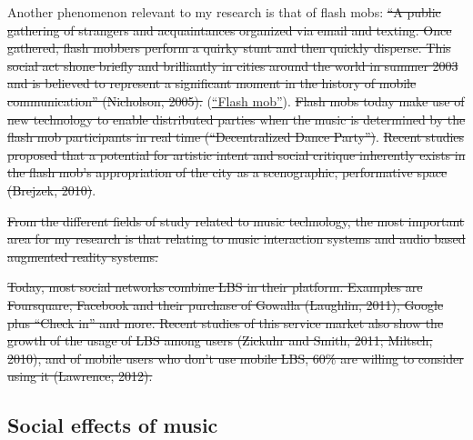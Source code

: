 Another phenomenon relevant to my research is that of flash mobs: \st{``A public gathering of strangers and acquaintances organized via email and texting. Once gathered, flash mobbers perform a quirky stunt and then quickly disperse. This social act shone briefly and brilliantly in cities around the world in summer 2003 and is believed to represent a significant moment in the history of mobile communication'' (Nicholson, 2005).}  (\href{http://en.wikipedia.org/wiki/Flash_mob}{``Flash mob''}).  \st{Flash mobs today make use of new technology to enable distributed parties when the music is determined by the flash mob participants in real time (``Decentralized Dance Party'')}. \st{Recent studies proposed that a potential for artistic intent and social critique inherently exists in the flash mob's appropriation of the city as a scenographic, performative space (Brejzek, 2010)}. 

\st{From the different fields of study related to music technology, the most important area for my research is that relating to music interaction systems and audio based augmented reality systems.}

\st{Today, most social networks combine LBS in their platform. Examples are Foursquare, Facebook and their purchase of Gowalla (Laughlin, 2011), Google plus ``Check in'' and more. Recent studies of this service market also show the growth of the usage of LBS among users (Zickuhr and Smith, 2011; Miltsch, 2010), and of mobile users who don't use mobile LBS, 60\% are willing to consider using it (Lawrence, 2012).}

\subsection{Social effects of music}

